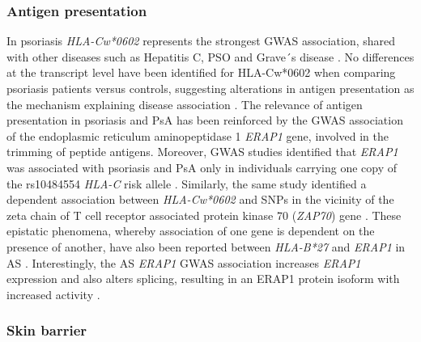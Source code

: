 \subsubsection*{Antigen presentation}
In psoriasis \textit{HLA-Cw*0602} represents the strongest GWAS association,  shared with other diseases such as Hepatitis C, PSO and Grave´s disease \parencite{Blais2011}. No differences at the transcript level have been identified for HLA-Cw*0602 when comparing psoriasis patients versus controls, suggesting alterations in antigen presentation as the mechanism explaining disease association \parencite{Hundhausen2012}. The relevance of antigen presentation in psoriasis and PsA has been reinforced by the GWAS association of the endoplasmic reticulum aminopeptidase 1 \textit{ERAP1} gene, involved in the trimming of peptide antigens. Moreover, GWAS studies identified that \textit{ERAP1} was associated with psoriasis and PsA only in individuals carrying one copy of the rs10484554 \textit{HLA-C} risk allele \parencite{Strange2010}. Similarly, the same study identified a dependent association between \textit{HLA-Cw*0602} and SNPs in the vicinity of the zeta chain of T cell receptor associated protein kinase 70 (\textit{ZAP70}) gene \parencite{Picard2009}.%
These epistatic phenomena, whereby association of one gene is dependent on the presence of another, have also been reported between \textit{HLA-B*27} and \textit{ERAP1} in AS \parencite{Evans2011, Cortes2015b}. Interestingly, the AS \textit{ERAP1} GWAS association increases \textit{ERAP1} expression and also alters splicing, resulting in an ERAP1 protein isoform with increased activity \parencite{Constatino2015, Hanson2018}.%


\subsubsection*{Skin barrier}

